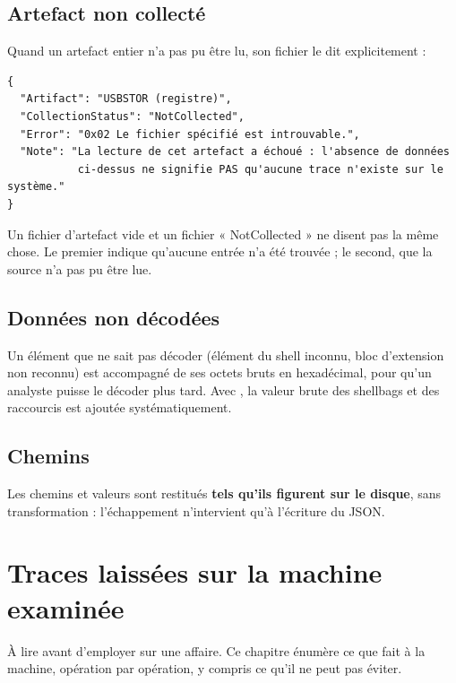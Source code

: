 \documentclass[11pt,a4paper,oneside]{report}
\begin{document}
\section{Artefact non collecté}

Quand un artefact entier n'a pas pu être lu, son fichier le dit explicitement :

\begin{lstlisting}
{
  "Artifact": "USBSTOR (registre)",
  "CollectionStatus": "NotCollected",
  "Error": "0x02 Le fichier spécifié est introuvable.",
  "Note": "La lecture de cet artefact a échoué : l'absence de données
           ci-dessus ne signifie PAS qu'aucune trace n'existe sur le système."
}
\end{lstlisting}

\begin{attention}
Un fichier d'artefact vide et un fichier « NotCollected » ne disent pas la même
chose. Le premier indique qu'aucune entrée n'a été trouvée ; le second, que
la source n'a pas pu être lue.
\end{attention}

\section{Données non décodées}

Un élément que \wac{} ne sait pas décoder (élément du shell inconnu, bloc
d'extension non reconnu) est accompagné de ses octets bruts en hexadécimal, pour
qu'un analyste puisse le décoder plus tard. Avec , la valeur brute des
shellbags et des raccourcis est ajoutée systématiquement.

\section{Chemins}

Les chemins et valeurs sont restitués \textbf{tels qu'ils figurent sur le
disque}, sans transformation : l'échappement n'intervient qu'à l'écriture du
JSON.

\chapter{Traces laissées sur la machine examinée}\label{chap:traces}

À lire avant d'employer \wac{} sur une affaire. Ce chapitre énumère ce que \wac{}
fait à la machine, opération par opération, y compris ce qu'il ne peut pas
éviter.
\end{document}
